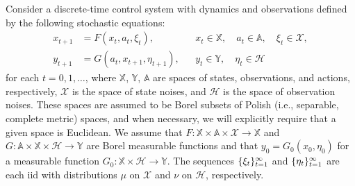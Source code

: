 \documentclass[11pt,onecolumn]{IEEEtran}  %
\newcommand{\Ab}{\mathbb{A}}
\newcommand{\Xb}{\mathbb{X}}
\newcommand{\Yb}{\mathbb{Y}}
\newcommand{\Xc}{\mathcal{X}}
\newcommand{\Hc}{\mathcal{H}}
\DeclarePairedDelimiter{\set}{\{}{\}}
\theoremstyle{definition}
\begin{document}
Consider a discrete-time control system with dynamics and observations defined by the following stochastic equations:
\begin{subequations}\label{eq:model}
    \begin{align}
        x_{t+1} &= F(x_t, a_t, \xi_t), && x_t \in \Xb, \quad a_t \in \Ab, \quad \xi_t \in \Xc, \label{eq:transition_model} \\
        y_{t+1} &= G(a_t, x_{t+1}, \eta_{t+1}), && y_t \in \Yb, \quad \eta_t \in \Hc \label{eq:observation_model}
    \end{align}
\end{subequations}
for each $t = 0, 1, \dots$, where $\Xb$, $\Yb$, $\Ab$ are spaces of states, observations, and actions, respectively, $\Xc$ is the space of state noises, and $\Hc$ is the space of observation noises. These spaces are assumed to be Borel subsets of Polish (i.e., separable, complete metric) spaces, and when necessary, we will explicitly require that a given space is Euclidean. We assume that $F : \Xb \times \Ab \times \Xc \to \Xb$ and $G : \Ab \times \Xb \times \Hc \to \Yb$ are Borel measurable functions and that $y_0 = G_0(x_0, \eta_0)$ for a measurable function $G_0 : \Xb \times \Hc \to \Yb$. The sequences $\set{\xi_t}_{t=1}^{\infty}$ and $\set{\eta_t}_{t=1}^{\infty}$ are each iid with distributions $\mu$ on $\Xc$ and $\nu$ on $\Hc$, respectively.
\end{document}
